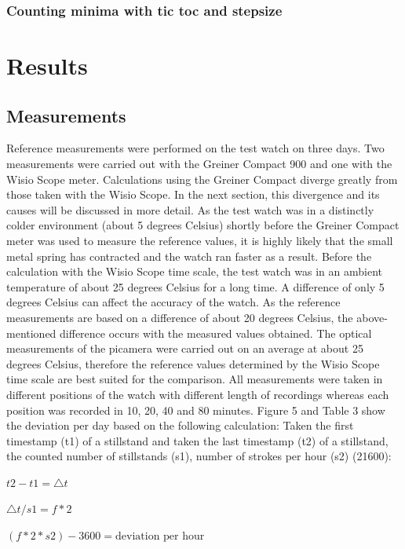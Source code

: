 \documentclass[12pt, a4paper]{report}
\begin{document}
    \subsection{Counting minima with tic toc and stepsize}
    
    \chapter{Results}
    
    \section{Measurements}
    Reference measurements were performed on the test watch on three days. Two measurements were carried out with the Greiner Compact 900 and one with the Wisio Scope meter. Calculations using the Greiner Compact diverge greatly from those taken with the Wisio Scope. In the next section, this divergence and its causes will be discussed in more detail. 
\bigskip
\newline
As the test watch was in a distinctly colder environment (about 5 degrees Celsius) shortly before the Greiner Compact meter was used to measure the reference values, it is highly likely that the small metal spring has contracted and the watch ran faster as a result. Before the calculation with the Wisio Scope time scale, the test watch was in an ambient temperature of about 25 degrees Celsius for a long time. A difference of only 5 degrees Celsius can affect the accuracy of the watch. As the reference measurements are based on a difference of about 20 degrees Celsius, the above-mentioned difference occurs with the measured values obtained.
The optical measurements of the picamera were carried out on an average at about 25 degrees Celsius, therefore the reference values determined by the Wisio Scope time scale are best suited for the comparison.
\bigskip
\newline
    All measurements were taken in different positions of the watch with different length
    of recordings whereas each position was recorded in 10, 20, 40 and 80 minutes.
\bigskip
\newline
    Figure 5 and Table 3 show the deviation per day based on the following calculation:
    Taken the first timestamp (t1) of a stillstand and taken the last timestamp (t2) of a stillstand, the counted number of stillstands (s1), number of strokes per hour (s2) (21600):
    \bigskip
    
    \begin{center}
    \(t2-t1 = \triangle t\)
        \bigskip
    
	\( \triangle t / s1 = f*2\)
	    \bigskip
    
    \((f*2*s2)-3600=\text{deviation per hour}\)
        
    \end{center}
    
\end{document}
